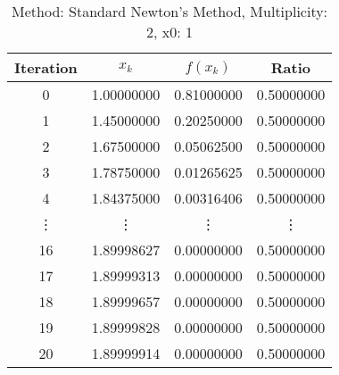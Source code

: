 \begin{table}
\centering
\caption{Method: Standard Newton's Method, Multiplicity: 2, x0: 1}
\label{tab:table_Standard_Newton's_Method_2_1}
\begin{tabular}{c c c c}
\toprule
Iteration &      $x_k$ &   $f(x_k)$ &      Ratio \\
\midrule
        0 & 1.00000000 & 0.81000000 & 0.50000000 \\
        1 & 1.45000000 & 0.20250000 & 0.50000000 \\
        2 & 1.67500000 & 0.05062500 & 0.50000000 \\
        3 & 1.78750000 & 0.01265625 & 0.50000000 \\
        4 & 1.84375000 & 0.00316406 & 0.50000000 \\
   \vdots &     \vdots &     \vdots &     \vdots \\
       16 & 1.89998627 & 0.00000000 & 0.50000000 \\
       17 & 1.89999313 & 0.00000000 & 0.50000000 \\
       18 & 1.89999657 & 0.00000000 & 0.50000000 \\
       19 & 1.89999828 & 0.00000000 & 0.50000000 \\
       20 & 1.89999914 & 0.00000000 & 0.50000000 \\
\bottomrule
\end{tabular}
\end{table}
